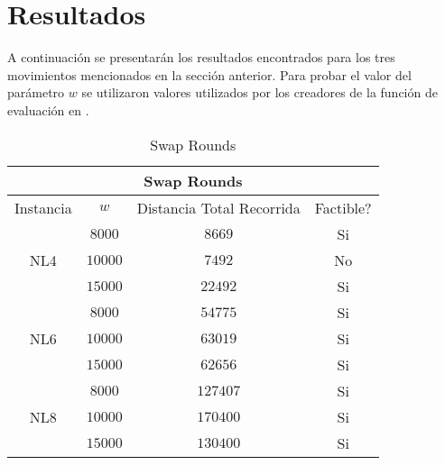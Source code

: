 \documentclass[letter, 10pt]{article}
\begin{document}
\newpage
\section{Resultados}
    A continuación se presentarán los resultados encontrados para los tres movimientos mencionados en la sección anterior. Para probar el valor del parámetro $w$ se utilizaron valores utilizados por los creadores de la función de evaluación en \cite{simulated}.
    
\begin{table}[h]
\centering
\label{my-label}
\begin{tabular}{cccc}
\multicolumn{4}{c}{\textbf{Swap Rounds}}                                                                                                                     \\ \hline
\multicolumn{1}{|c|}{Instancia}            & \multicolumn{1}{c|}{$w$}     & \multicolumn{1}{c|}{Distancia Total  Recorrida} & \multicolumn{1}{c|}{Factible?} \\ \hline
\multicolumn{1}{|c|}{\multirow{3}{*}{NL4}} & \multicolumn{1}{c|}{$8000$}  & \multicolumn{1}{c|}{$8669$}                     & \multicolumn{1}{c|}{Si}        \\ \cline{2-4} 
\multicolumn{1}{|c|}{}                     & \multicolumn{1}{c|}{$10000$} & \multicolumn{1}{c|}{$7492$}                     & \multicolumn{1}{c|}{No}        \\ \cline{2-4} 
\multicolumn{1}{|c|}{}                     & \multicolumn{1}{c|}{$15000$} & \multicolumn{1}{c|}{$22492$}                    & \multicolumn{1}{c|}{Si}        \\ \hline
\multicolumn{1}{|c|}{\multirow{3}{*}{NL6}} & \multicolumn{1}{c|}{$8000$}  & \multicolumn{1}{c|}{$54775$}                    & \multicolumn{1}{c|}{Si}        \\ \cline{2-4} 
\multicolumn{1}{|c|}{}                     & \multicolumn{1}{c|}{$10000$} & \multicolumn{1}{c|}{$63019$}                    & \multicolumn{1}{c|}{Si}        \\ \cline{2-4} 
\multicolumn{1}{|c|}{}                     & \multicolumn{1}{c|}{$15000$} & \multicolumn{1}{c|}{$62656$}                    & \multicolumn{1}{c|}{Si}        \\ \hline
\multicolumn{1}{|c|}{\multirow{3}{*}{NL8}} & \multicolumn{1}{c|}{$8000$}  & \multicolumn{1}{c|}{$127407$}                   & \multicolumn{1}{c|}{Si}        \\ \cline{2-4} 
\multicolumn{1}{|c|}{}                     & \multicolumn{1}{c|}{$10000$} & \multicolumn{1}{c|}{$170400$}                   & \multicolumn{1}{c|}{Si}        \\ \cline{2-4} 
\multicolumn{1}{|c|}{}                     & \multicolumn{1}{c|}{$15000$} & \multicolumn{1}{c|}{$130400$}                   & \multicolumn{1}{c|}{Si}        \\ \hline
\end{tabular}
\caption{Swap Rounds}
\end{table}
\end{document}
